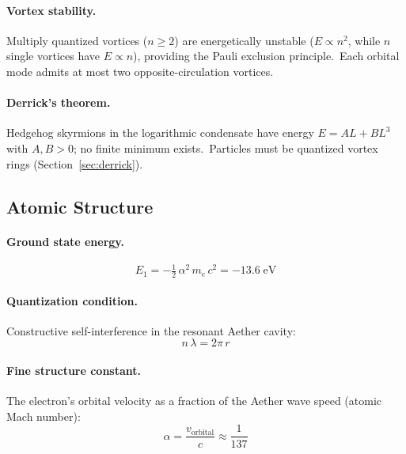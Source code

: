 ﻿\documentclass[12pt,letterpaper]{article}
\begin{document}
\paragraph{Vortex stability.}
Multiply quantized vortices ($n \geq 2$) are energetically unstable
($E \propto n^2$, while $n$ single vortices have $E \propto n$), providing
the Pauli exclusion principle.\ Each orbital mode admits at most two
opposite-circulation vortices.

\paragraph{Derrick's theorem.}
Hedgehog skyrmions in the logarithmic condensate have energy
$E = A L + B L^3$ with $A, B > 0$; no finite minimum exists.\ Particles must
be quantized vortex rings (Section~\ref{sec:derrick}).


\subsection{Atomic Structure}

\paragraph{Ground state energy.}
%
\begin{equation}
  E_1 = -\tfrac{1}{2}\,\alpha^2\,m_e\,c^2 = -13.6\;\mathrm{eV}
  \label{eq:sum-hydrogen}
\end{equation}

\paragraph{Quantization condition.}
Constructive self-interference in the resonant Aether cavity:
%
\begin{equation}
  n\,\lambda = 2\pi\,r
  \label{eq:sum-quantization}
\end{equation}

\paragraph{Fine structure constant.}
The electron's orbital velocity as a fraction of the Aether wave speed
(atomic Mach number):
%
\begin{equation}
  \alpha = \frac{v_{\mathrm{orbital}}}{c} \approx \frac{1}{137}
  \label{eq:sum-alpha}
\end{equation}
\end{document}
